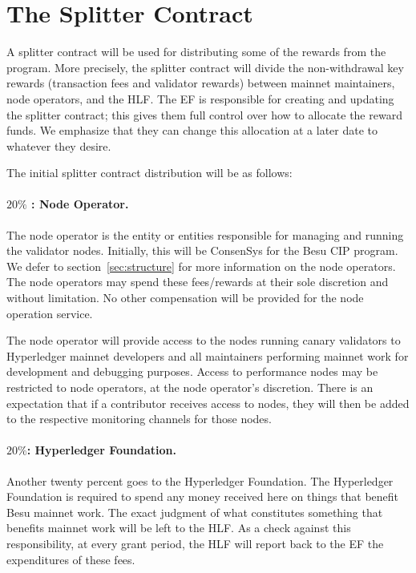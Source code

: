
\section{The Splitter Contract} \label{sec:splitter}
A splitter contract will be used for distributing some of the rewards from the program.  More precisely, the splitter contract will divide the non-withdrawal key rewards (transaction fees and validator rewards) between mainnet maintainers, node operators, and the HLF.  The EF is responsible for creating and updating the splitter contract; this gives them full control over how to allocate the reward funds.  We emphasize that they can change this allocation at a later date to whatever they desire.

The initial splitter contract distribution will be as follows:

\paragraph{$20\%$ : \textbf{Node Operator}.}  The node operator is the entity or entities responsible for managing and running the validator nodes.  Initially, this will be ConsenSys for the Besu CIP program.  We defer to section~\ref{sec:structure} for more information on the node operators.  The node operators may spend these fees/rewards at their sole discretion and without limitation. No other compensation will be provided for the node operation service.

The node operator will provide access to the nodes running canary validators to Hyperledger mainnet developers and all maintainers performing mainnet work for development and debugging purposes. Access to performance nodes may be restricted to node operators, at the node operator’s discretion. There is an expectation that if a contributor receives access to nodes, they will then be added to the respective monitoring channels for those nodes.

\paragraph{$20\%$:  \textbf{Hyperledger Foundation}.}  Another twenty percent goes to the Hyperledger Foundation.  The Hyperledger Foundation is required to spend any money received here on things that benefit Besu mainnet work.  The exact judgment of what constitutes something that benefits mainnet work will be left to the HLF.  As a check against this responsibility, at every grant period, the HLF will report back to the EF the expenditures of these fees.

